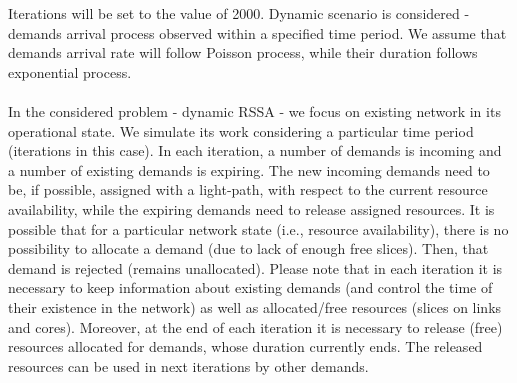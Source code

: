 \documentclass[conference]{IEEEtran}
\begin{document}
Iterations will be set to the value of 2000. Dynamic scenario is considered - demands arrival process observed within a specified time period.
We assume that demands arrival rate will follow Poisson process, while their duration follows exponential process.
\\ \\
In the considered problem - dynamic RSSA - we focus on existing network in its operational state. We simulate its work considering a particular time period (iterations in this case). In each iteration, a number of demands is incoming and a number of existing demands is expiring. The new incoming demands need to be, if possible, assigned with a light-path, with respect to the current resource availability, while the expiring demands need to release assigned resources. It is possible that for a particular network state (i.e., resource availability), there is no possibility to allocate a demand (due to lack of enough free slices). Then, that demand is rejected (remains unallocated). Please note that in each iteration it is necessary to keep information about existing demands (and control the time of their existence in the network) as well as allocated/free resources (slices on links and cores). Moreover, at the end of each iteration it is necessary to release (free) resources allocated for demands, whose duration currently ends. The released resources can be used in next iterations by other demands.
\end{document}
